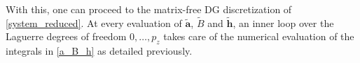 \documentclass{article}
\newcommand{\atbf}{\widetilde{\mathbf{a}}}
\newcommand{\Btbf}{\widetilde{B}}
\newcommand{\htbf}{\widetilde{\mathbf{h}}}
\begin{document}
With this, one can proceed to the matrix-free DG discretization of \eqref{system_reduced}. At every evaluation of $\atbf$, $\Btbf$ and $\htbf$, an inner loop over the Laguerre degrees of freedom $0,\dots,p_z$ takes care of the numerical evaluation of the integrals in \eqref{a_B_h} as detailed previously.
	
	
	
	
	
	
	
	
\end{document}
